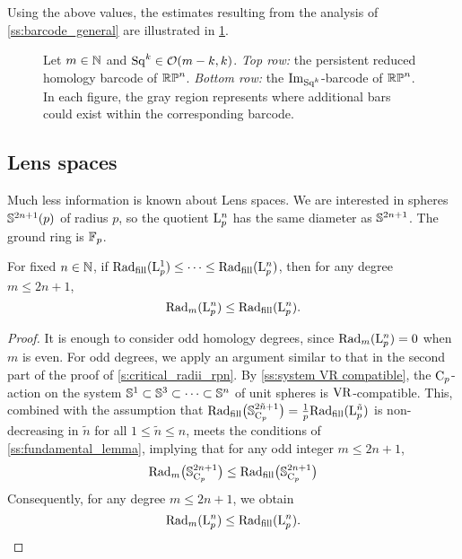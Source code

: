 Using the above values, the estimates resulting from the analysis of \cref{ss:barcode_general} are illustrated in \cref{fig:sq barcodes}.

\begin{figure}
	\centering
	
	\caption{Let $m \in \mathbb{N}$ and $\mathrm{Sq}^k \in \mathcal{O}(m-k, k)$.
        \emph{Top row:} the persistent reduced homology barcode of $\mathbb{RP}^n$.
		\emph{Bottom row:} the $\operatorname{Im}_{\mathrm{Sq}^k}$-barcode of $\mathbb{RP}^n$.
        In each figure, the gray region represents where additional bars could exist within the corresponding barcode.
	}
	\label{fig:sq barcodes}
\end{figure}

\subsection{Lens spaces}\label{s:critical_radii_lens}

Much less information is known about Lens spaces.
We are interested in spheres \(\mathbb{S}^{2n+1}(p)\) of radius \(p\), so the quotient \(\mathrm{L}_p^n\) has the same diameter as \(\mathbb{S}^{2n+1}\).
The ground ring is \({\mathbb{F}_p}\).

\medskip\lemma
For fixed $n\in \mathbb{N}$, if $\mathrm{Rad}_{\mathrm{fill}}(\mathrm{L}^1_p) \leq \dotsb \leq \mathrm{Rad}_{\mathrm{fill}}(\mathrm{L}^n_p)$, then for any degree $m\leq 2n+1$,
\[
\mathrm{Rad}_{m}(\mathrm{L}^n_p) \leq \mathrm{Rad}_{\mathrm{fill}}(\mathrm{L}^n_p).
\]

\begin{proof}
    It is enough to consider odd homology degrees, since $\mathrm{Rad}_{m}(\mathrm{L}^n_p) = 0$ when $m$ is even.
    For odd degrees, we apply an argument similar to that in the second part of the proof of \cref{s:critical_radii_rpn}.
    By \cref{ss:system VR compatible}, the $\mathrm{C}_p$-action on the system $\mathbb{S}^1 \subset \mathbb{S}^3 \subset \dotsb \subset \mathbb{S}^n$ of unit spheres is \(\mathrm{VR}\)-compatible.
    This, combined with the assumption that $\mathrm{Rad}_{\mathrm{fill}}\big(\mathbb{S}^{2\tilde{n}+1}_{\mathrm{C}_p}\big) = \tfrac{1}{p} \mathrm{Rad}_{\mathrm{fill}}(\mathrm{L}^{\tilde{n}}_p)$ is non-decreasing in $\tilde{n}$ for all $1\leq \tilde{n} \leq n$, meets the conditions of \cref{ss:fundamental_lemma}, implying that for any odd integer $m \leq 2n+1$,
    \[
    \mathrm{Rad}_m\big(\mathbb{S}^{2n+1}_{\mathrm{C}_p}\big) \leq \mathrm{Rad}_{\mathrm{fill}}\big(\mathbb{S}^{2n+1}_{\mathrm{C}_p}\big)
    \]
    Consequently, for any degree $m \leq 2n+1$, we obtain
    \[
    \firstdeath{m}{\rL^n_p} \leq \fillrad(\rL^n_p). %
    \qedhere
    \]
\end{proof}